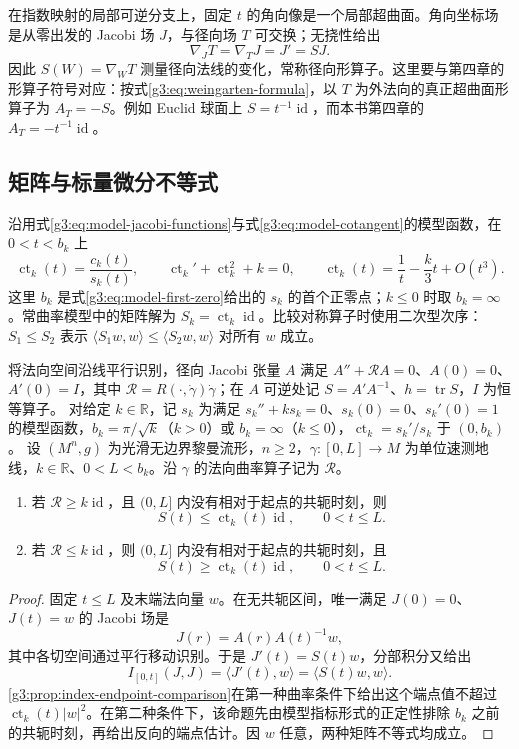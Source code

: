 \ProseParagraphBreak

在指数映射的局部可逆分支上，固定 \(t\) 的角向像是一个局部超曲面。角向坐标场是从零出发的 Jacobi 场 \(J\)，与径向场 \(T\) 可交换；无挠性给出
\[
	\nabla_JT=\nabla_TJ=J'=SJ.
\]
因此 \(S(W)=\nabla_WT\) 测量径向法线的变化，常称径向形算子。这里要与第四章的形算子符号对应：按式\eqref{g3:eq:weingarten-formula}，以 \(T\) 为外法向的真正超曲面形算子为 \(A_T=-S\)。例如 Euclid 球面上 \(S=t^{-1}\operatorname{id}\)，而本书第四章的 \(A_T=-t^{-1}\operatorname{id}\)。

\subsection{矩阵与标量微分不等式}
\label{g3:subsec:0702:02}

沿用式\eqref{g3:eq:model-jacobi-functions}与式\eqref{g3:eq:model-cotangent}的模型函数，在 \(0<t<b_k\) 上
\[
	\operatorname{ct}_k(t)=\frac{c_k(t)}{s_k(t)},\qquad
	\operatorname{ct}_k'+\operatorname{ct}_k^2+k=0,\qquad
	\operatorname{ct}_k(t)=\frac1t-\frac{k}{3}t+O(t^3).
\]
这里 \(b_k\) 是式\eqref{g3:eq:model-first-zero}给出的 \(s_k\) 的首个正零点；\(k\le0\) 时取 \(b_k=\infty\)。常曲率模型中的矩阵解为 \(S_k=\operatorname{ct}_k\operatorname{id}\)。比较对称算子时使用二次型次序：\(S_1\le S_2\) 表示 \(\langle S_1w,w\rangle\le\langle S_2w,w\rangle\) 对所有 \(w\) 成立。

\begin{theorem}\label{g3:thm:riccati-matrix-comparison}
	将法向空间沿线平行识别，径向 Jacobi 张量 \(A\) 满足 \(A''+\mathcal RA=0\)、\(A(0)=0\)、\(A'(0)=I\)，其中 \(\mathcal R=R(\cdot,\dot\gamma)\dot\gamma\)；在 \(A\) 可逆处记 \(S=A'A^{-1}\)、\(h=\operatorname{tr}S\)，\(I\) 为恒等算子。
	对给定 \(k\in\mathbb R\)，记 \(s_k\) 为满足 \(s_k''+ks_k=0\)、\(s_k(0)=0\)、\(s_k'(0)=1\) 的模型函数，\(b_k=\pi/\sqrt k\)（\(k>0\)）或 \(b_k=\infty\)（\(k\le0\)），\(\operatorname{ct}_k=s_k'/s_k\) 于 \((0,b_k)\)。
	设 \((M^n,g)\) 为光滑无边界黎曼流形，\(n\ge2\)，\(\gamma:[0,L]\to M\) 为单位速测地线，\(k\in\mathbb R\)、\(0<L<b_k\)。沿 \(\gamma\) 的法向曲率算子记为 \(\mathcal R\)。
	\begin{enumerate}
		\item 若 \(\mathcal R\ge k\operatorname{id}\)，且 \((0,L]\) 内没有相对于起点的共轭时刻，则
		\[
			S(t)\le\operatorname{ct}_k(t)\operatorname{id},\qquad0<t\le L.
		\]
		\item 若 \(\mathcal R\le k\operatorname{id}\)，则 \((0,L]\) 内没有相对于起点的共轭时刻，且
		\[
			S(t)\ge\operatorname{ct}_k(t)\operatorname{id},\qquad0<t\le L.
		\]
	\end{enumerate}
\end{theorem}
\begin{proof}
	固定 \(t\le L\) 及末端法向量 \(w\)。在无共轭区间，唯一满足 \(J(0)=0\)、\(J(t)=w\) 的 Jacobi 场是
	\[
		J(r)=A(r)A(t)^{-1}w,
	\]
	其中各切空间通过平行移动识别。于是 \(J'(t)=S(t)w\)，分部积分又给出
	\[
		I_{[0,t]}(J,J)=\langle J'(t),w\rangle=\langle S(t)w,w\rangle.
	\]
	\cref{g3:prop:index-endpoint-comparison}在第一种曲率条件下给出这个端点值不超过 \(\operatorname{ct}_k(t)|w|^2\)。在第二种条件下，该命题先由模型指标形式的正定性排除 \(b_k\) 之前的共轭时刻，再给出反向的端点估计。因 \(w\) 任意，两种矩阵不等式均成立。
\end{proof}

